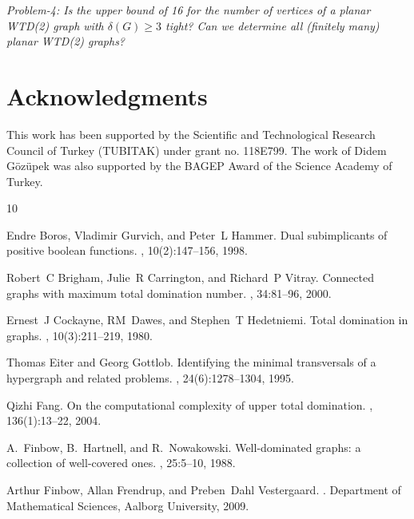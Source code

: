 \documentclass[11pt]{article}
\theoremstyle{definition}
\begin{document}
\emph{Problem-4: Is the upper bound of 16 for the number of vertices of a planar WTD(2) graph with $\delta(G) \geq 3$ tight? Can we determine all (finitely many) planar WTD(2) graphs?}\\


\section*{Acknowledgments}
This work has been supported by the Scientific and Technological Research
Council of Turkey (TUBITAK) under grant no. 118E799. The work of Didem Gözüpek was also supported by the BAGEP Award of the Science Academy of Turkey.




%
%


\begin{thebibliography}{10}
	
	Endre Boros, Vladimir Gurvich, and Peter~L Hammer.
	\newblock Dual subimplicants of positive boolean functions.
	, 10(2):147--156, 1998.
	
	Robert~C Brigham, Julie~R Carrington, and Richard~P Vitray.
	\newblock Connected graphs with maximum total domination number.
	, 34:81--96, 2000.
	
	Ernest~J Cockayne, RM~Dawes, and Stephen~T Hedetniemi.
	\newblock Total domination in graphs.
	, 10(3):211--219, 1980.
	
	Thomas Eiter and Georg Gottlob.
	\newblock Identifying the minimal transversals of a hypergraph and related
	problems.
	, 24(6):1278--1304, 1995.
	
	Qizhi Fang.
	\newblock On the computational complexity of upper total domination.
	, 136(1):13--22, 2004.
	
	A.~Finbow, B.~Hartnell, and R.~Nowakowski.
	\newblock Well-dominated graphs: a collection of well-covered ones.
	, 25:5--10, 1988.
	
	Arthur Finbow, Allan Frendrup, and Preben~Dahl Vestergaard.
	.
	\newblock Department of Mathematical Sciences, Aalborg University, 2009.
	

\end{thebibliography}
\end{document}
